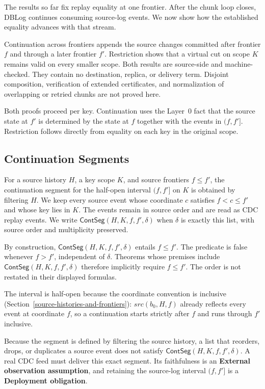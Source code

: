 \documentclass[letterpaper,10pt,twocolumn]{article}
\newcommand{\Src}{\mathit{src}}
\newcommand{\ContSeg}{\mathsf{ContSeg}}
\begin{document}
The results so far fix replay equality at one frontier. After the chunk
loop closes, DBLog continues consuming source-log events. We now show
how the established equality advances with that stream.

Continuation across frontiers appends the source changes committed
after frontier $f$ and through a later frontier $f'$. Restriction shows
that a virtual cut on scope $K$ remains valid on every smaller scope.
Both results are source-side and machine-checked. They contain no
destination, replica, or delivery term. Disjoint composition,
verification of extended certificates, and normalization of overlapping
or retried chunks are not proved here.

Both proofs proceed per key. Continuation uses the Layer~0 fact that the
source state at $f'$ is determined by the state at $f$ together with the
events in $(f,f']$. Restriction follows directly from equality on each
key in the original scope.

\subsection{Continuation Segments}\label{continuation-segments}

For a source history $H$, a key scope $K$, and source frontiers
$f \le f'$, the continuation segment for the half-open interval
$(f,f']$ on $K$ is obtained by filtering $H$. We keep every source event
whose coordinate $c$ satisfies $f<c\le f'$ and whose key lies in $K$.
The events remain in source order and are read as CDC replay events. We
write $\ContSeg(H,K,f,f',\delta)$ when $\delta$ is exactly this list,
with source order and multiplicity preserved.

By construction, $\ContSeg(H,K,f,f',\delta)$ entails $f \le f'$. The
predicate is false whenever $f > f'$, independent of $\delta$. Theorems
whose premises include $\ContSeg(H,K,f,f',\delta)$ therefore implicitly
require $f \le f'$. The order is not restated in their displayed
formulas.

The interval is half-open because the coordinate convention is
inclusive (Section~\ref{source-histories-and-frontiers}):
$\Src(b_0,H,f)$ already reflects every event at coordinate $f$, so a
continuation starts strictly after $f$ and runs through $f'$ inclusive.

Because the segment is defined by filtering the source history, a list
that reorders, drops, or duplicates a source event does not satisfy
$\ContSeg(H,K,f,f',\delta)$. A real CDC feed must deliver this exact
segment. Its faithfulness is an \textbf{External observation
assumption}, and retaining the source-log interval $(f,f']$ is a
\textbf{Deployment obligation}.
\end{document}

